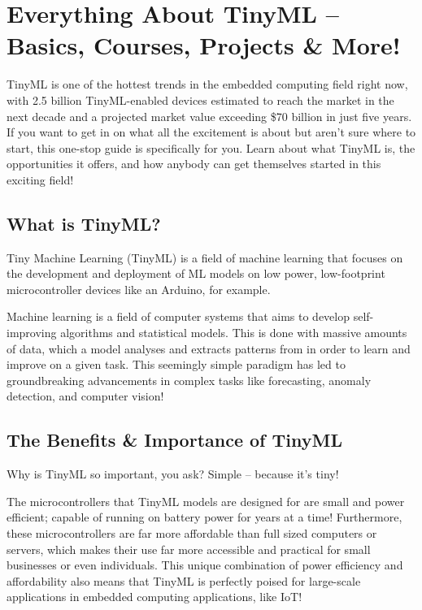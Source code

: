 %
%
%


\chapter{Everything About TinyML – Basics, Courses, Projects \& More!}


TinyML is one of the hottest trends in the embedded computing field right now, with 2.5 billion TinyML-enabled devices estimated to reach the market in the next decade and a projected market value exceeding \$70 billion in just five years. If you want to get in on what all the excitement is about but aren’t sure where to start, this one-stop guide is specifically for you. Learn about what TinyML is, the opportunities it offers, and how anybody can get themselves started in this exciting field!

\section{What is TinyML?}

Tiny Machine Learning (TinyML) is a field of machine learning that focuses on the development and deployment of ML models on low power, low-footprint microcontroller devices like an Arduino, for example.


Machine learning is a field of computer systems that aims to develop self-improving algorithms and statistical models. This is done with massive amounts of data, which a model analyses and extracts patterns from in order to learn and improve on a given task. This seemingly simple paradigm has led to groundbreaking advancements in complex tasks like forecasting, anomaly detection, and computer vision!

\section{The Benefits \& Importance of TinyML}

Why is TinyML so important, you ask? Simple -- because it's tiny!

The microcontrollers that TinyML models are designed for are small and power efficient; capable of running on battery power for years at a time! Furthermore, these microcontrollers are far more affordable than full sized computers or servers, which makes their use far more accessible and practical for small businesses or even individuals. This unique combination of power efficiency and affordability also means that TinyML is perfectly poised for large-scale applications in embedded computing applications, like IoT!

